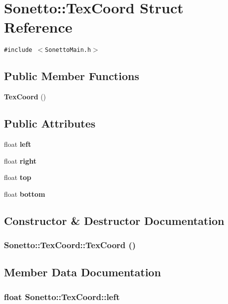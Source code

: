 \section{Sonetto::TexCoord Struct Reference}
\label{struct_sonetto_1_1_tex_coord}
{\tt \#include $<$SonettoMain.h$>$}

\subsection*{Public Member Functions}
\begin{CompactItemize}
\item 
{\bf TexCoord} ()
\end{CompactItemize}
\subsection*{Public Attributes}
\begin{CompactItemize}
\item 
float {\bf left}
\item 
float {\bf right}
\item 
float {\bf top}
\item 
float {\bf bottom}
\end{CompactItemize}


\subsection{Constructor \& Destructor Documentation}
\subsubsection{\setlength{\rightskip}{0pt plus 5cm}Sonetto::TexCoord::TexCoord ()\hspace{0.3cm}{\tt  [inline]}}\label{struct_sonetto_1_1_tex_coord_529f94f609e760460bf01ebdeb1cf2ba}




\subsection{Member Data Documentation}
\subsubsection{\setlength{\rightskip}{0pt plus 5cm}float {\bf Sonetto::TexCoord::left}}\label{struct_sonetto_1_1_tex_coord_03c37675aa056ac570054ea9453227a3}


